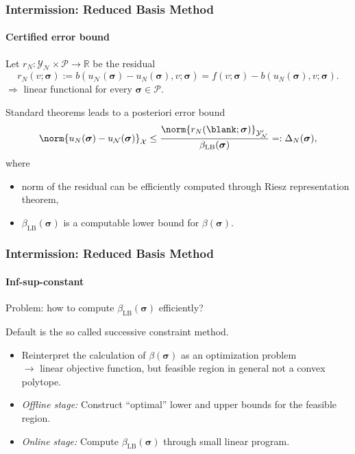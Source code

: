 \begin{frame}[t]
    \frametitle{Intermission: Reduced Basis Method}
    \framesubtitle{Certified error bound}
    Let $r_{N} \colon \mathcal Y_{\mathcal N} \times \mathcal P \to \mathbb{R}$ be the residual
    \begin{equation}
        r_{N}(v; \bm \sigma) := b(u_{\mathcal N}(\bm \sigma) - u_{N}(\bm \sigma), v; \bm \sigma) = f(v; \bm \sigma) - b(u_{N}(\bm \sigma), v; \bm \sigma).
    \end{equation}
    $\Rightarrow$ linear functional for every $\bm \sigma \in \mathcal P$.

    Standard theorems leads to a posteriori error bound
    \begin{equation}
        \norm{u_{N}(\bm \sigma) - u_{\mathcal N}(\bm \sigma)}_{\mathcal X} \leq \frac{\norm{r_{N}(\blank; \bm \sigma)}_{\mathcal Y_{\mathcal N}'}}{\beta_{\mathrm{LB}}(\bm \sigma)} =: \Delta_{N}(\bm \sigma),
    \end{equation}
    where
    \begin{itemize}
        \item norm of the residual can be efficiently computed through Riesz representation theorem,
        \item $\beta_{\mathrm{LB}}(\bm \sigma)$ is a computable lower bound for $\beta(\bm \sigma)$.
    \end{itemize}
\end{frame}

\begin{frame}[t]
    \frametitle{Intermission: Reduced Basis Method}
    \framesubtitle{Inf-sup-constant}

    Problem: how to compute $\beta_{\mathrm{LB}}(\bm \sigma)$ efficiently?

    \vfill
    Default is the so called successive constraint method.

    \begin{itemize}
        \item Reinterpret the calculation of $\beta(\bm \sigma)$ as an optimization problem
        \\$\rightarrow$ linear objective function, but feasible region in general not a convex polytope.
        \item {}\emph{Offline stage:} Construct \enquote{optimal} lower and upper bounds for the feasible region.
        \item {}\emph{Online stage:} Compute $\beta_{\mathrm{LB}}(\bm \sigma)$ through small linear program.
    \end{itemize}

    \vfill
\end{frame}

